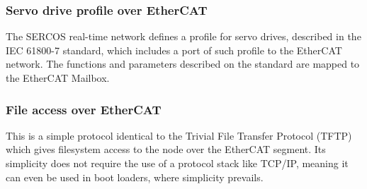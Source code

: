 \subsubsection{Servo drive profile over EtherCAT}

The SERCOS \texttrademark{} real-time network defines a profile for servo drives, described in the IEC 61800-7 standard, which includes a port of such profile to the EtherCAT network. The functions and parameters described on the standard are mapped to the EtherCAT Mailbox.

\subsubsection{File access over EtherCAT}

This is a simple protocol identical to the Trivial File Transfer Protocol (TFTP) which gives filesystem access to the node over the EtherCAT segment.
Its simplicity does not require the use of a protocol stack like TCP/IP, meaning it can even be used in boot loaders, where simplicity prevails.
